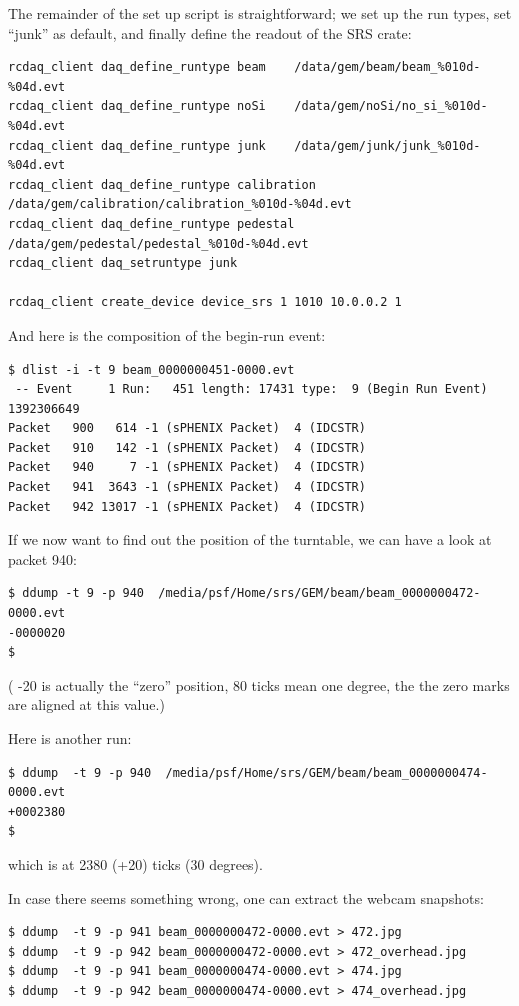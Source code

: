 \documentclass{article}[11pt]
\begin{document}
The remainder of the set up script is straightforward; we set up the run types, 
set ``junk'' as default, and finally define the readout of the SRS crate:

\begin{verbatim} 
rcdaq_client daq_define_runtype beam    /data/gem/beam/beam_%010d-%04d.evt
rcdaq_client daq_define_runtype noSi    /data/gem/noSi/no_si_%010d-%04d.evt
rcdaq_client daq_define_runtype junk    /data/gem/junk/junk_%010d-%04d.evt
rcdaq_client daq_define_runtype calibration /data/gem/calibration/calibration_%010d-%04d.evt
rcdaq_client daq_define_runtype pedestal /data/gem/pedestal/pedestal_%010d-%04d.evt
rcdaq_client daq_setruntype junk

rcdaq_client create_device device_srs 1 1010 10.0.0.2 1
\end{verbatim} 
 
And here is the composition of the begin-run event:

\begin{verbatim} 
$ dlist -i -t 9 beam_0000000451-0000.evt
 -- Event     1 Run:   451 length: 17431 type:  9 (Begin Run Event)  1392306649
Packet   900   614 -1 (sPHENIX Packet)  4 (IDCSTR)
Packet   910   142 -1 (sPHENIX Packet)  4 (IDCSTR)
Packet   940     7 -1 (sPHENIX Packet)  4 (IDCSTR)
Packet   941  3643 -1 (sPHENIX Packet)  4 (IDCSTR)
Packet   942 13017 -1 (sPHENIX Packet)  4 (IDCSTR)
\end{verbatim} 

If we now want to find out the position of the turntable, we can have  a
look at packet 940:

\begin{verbatim} 
$ ddump -t 9 -p 940  /media/psf/Home/srs/GEM/beam/beam_0000000472-0000.evt
-0000020
$
\end{verbatim} 

( -20 is actually the ``zero'' position, 80 ticks mean one degree, the the zero marks are aligned at this value.)

Here is another run:

\begin{verbatim} 
$ ddump  -t 9 -p 940  /media/psf/Home/srs/GEM/beam/beam_0000000474-0000.evt
+0002380
$ 
\end{verbatim} 

which is at 2380 (+20) ticks (30 degrees).

In case there seems something wrong, one can extract the webcam snapshots:

\begin{verbatim} 
$ ddump  -t 9 -p 941 beam_0000000472-0000.evt > 472.jpg
$ ddump  -t 9 -p 942 beam_0000000472-0000.evt > 472_overhead.jpg
$ ddump  -t 9 -p 941 beam_0000000474-0000.evt > 474.jpg
$ ddump  -t 9 -p 942 beam_0000000474-0000.evt > 474_overhead.jpg
\end{verbatim} 
\end{document}
